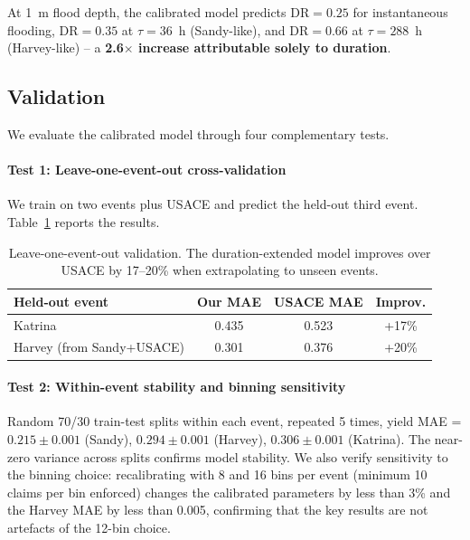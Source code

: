 At 1~m flood depth, the calibrated model predicts $\text{DR} = 0.25$ for instantaneous flooding, $\text{DR} = 0.35$ at $\tau = 36$~h (Sandy-like), and $\text{DR} = 0.66$ at $\tau = 288$~h (Harvey-like) -- a \textbf{2.6$\times$ increase attributable solely to duration}.

\subsection{Validation}
\label{ssec: validation}

We evaluate the calibrated model through four complementary tests.

\paragraph{Test 1: Leave-one-event-out cross-validation}
We train on two events plus USACE and predict the held-out third event. Table~\ref{tab: loo results} reports the results.

\begin{table}[h!]
\centering
\small
\begin{tabular}{|l|c|c|c|}
\hline
\textbf{Held-out event} & \textbf{Our MAE} & \textbf{USACE MAE} & \textbf{Improv.} \\
\hline
Katrina & 0.435 & 0.523 & +17\% \\
Harvey (from Sandy+USACE) & 0.301 & 0.376 & +20\% \\
\hline
\end{tabular}
\caption{Leave-one-event-out validation. The duration-extended model improves over USACE by 17--20\% when extrapolating to unseen events.}
\label{tab: loo results}
\end{table}

\paragraph{Test 2: Within-event stability and binning sensitivity}
Random 70/30 train-test splits within each event, repeated 5 times, yield MAE = $0.215 \pm 0.001$ (Sandy), $0.294 \pm 0.001$ (Harvey), $0.306 \pm 0.001$ (Katrina). The near-zero variance across splits confirms model stability. We also verify sensitivity to the binning choice: recalibrating with 8 and 16 bins per event (minimum 10 claims per bin enforced) changes the calibrated parameters by less than 3\% and the Harvey MAE by less than 0.005, confirming that the key results are not artefacts of the 12-bin choice.

